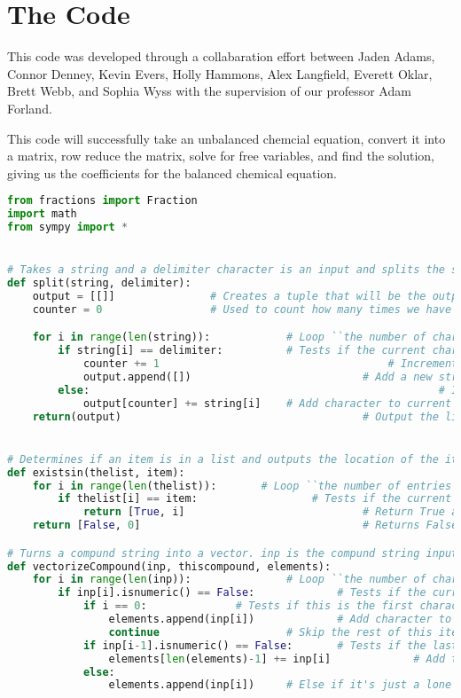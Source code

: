 \documentclass[10pt]{article}
\begin{document}
\section{The Code}
This code was developed through a collabaration effort between Jaden Adams, Connor Denney, Kevin Evers, Holly Hammons,
Alex Langfield, Everett Oklar, Brett Webb, and Sophia Wyss with the supervision of our professor Adam Forland.

This code will successfully take an unbalanced chemcial equation, convert it into a matrix, row reduce the matrix, solve for free variables, and find the solution, giving us the coefficients for the balanced chemical equation.
\begin{lstlisting}[language = Python]
from fractions import Fraction
import math
from sympy import *


# Takes a string and a delimiter character is an input and splits the string at the specified delimiter. Outputs the string as a tuple split at the delimiter.
def split(string, delimiter):	
	output = [[]]				# Creates a tuple that will be the output of the function
	counter = 0					# Used to count how many times we have split our string

	for i in range(len(string)):			# Loop ``the number of characters in string'' times
		if string[i] == delimiter:			# Tests if the current character is the delimiter
			counter += 1									# Increment the counter
			output.append([])							# Add a new string to the tuple
		else:														# If the current character is not the delimiter
			output[counter] += string[i]	# Add character to current string
	return(output)										# Output the list of strings


# Determines if an item is in a list and outputs the location of the item.
def existsin(thelist, item):
	for i in range(len(thelist)): 		# Loop ``the number of entries in thelist'' times
		if thelist[i] == item: 					# Tests if the current item is the item we're looking for
			return [True, i]							# Return True and location of the item.
	return [False, 0]									# Returns False if the item is not in the current list.

# Turns a compund string into a vector. inp is the compund string input; thiscompound is an empty vector of the same length in which we will store our resulting vector; elements is an empty list to keep track of what elements are in the equation. Outputs an updated elements list and the compound vector, thiscompound.
def vectorizeCompound(inp, thiscompound, elements):
	for i in range(len(inp)):				# Loop ``the number of characters in the string inp'' times
		if inp[i].isnumeric() == False:				# Tests if the current character is not a number 
			if i == 0:				# Tests if this is the first character in the element 
				elements.append(inp[i])				# Add character to elements list
				continue					# Skip the rest of this iteration and go to the next one
			if inp[i-1].isnumeric() == False:		# Tests if the last character was also not a number
				elements[len(elements)-1] += inp[i]				# Add this character to the existing character, rather than making a new item for that character
			else:
				elements.append(inp[i])		# Else if it's just a lone letter so far, add it to the list
    

\end{lstlisting}
\end{document}
